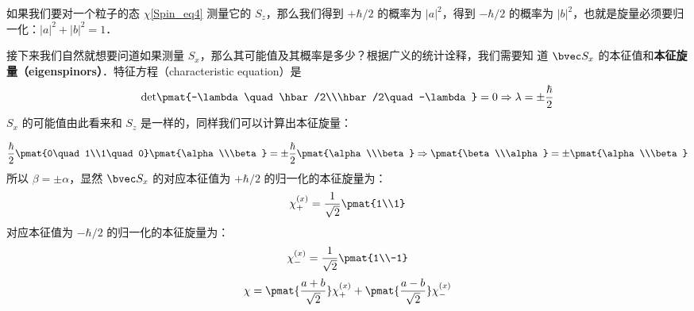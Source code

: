 如果我们要对一个粒子的态 $\chi$\autoref{Spin_eq4} 测量它的 $S_z$，那么我们得到 $+\hbar/2$ 的概率为 $|a|^2$，得到 $-\hbar/2$ 的概率为 $|b|^2$，也就是旋量必须要归一化：$|a|^2+ |b|^2 = 1$．

接下来我们自然就想要问道如果测量 $S_x$，那么其可能值及其概率是多少？根据广义的统计诠释，我们需要知
道 $\bvec S_x$ 的本征值和\textbf{本征旋量（eigenspinors）}．特征方程（characteristic equation）是
\begin{equation}
\rm{det}\pmat{-\lambda \quad \hbar/2\\\hbar/2\quad -\lambda}=0\Rightarrow\lambda=\pm\frac{\hbar}{2}
\end{equation}
$S_x$ 的可能值由此看来和 $S_z$ 是一样的，同样我们可以计算出本征旋量：

\begin{equation}
\frac{\hbar}{2}\pmat{0\quad 1\\1\quad0}\pmat{\alpha\\\beta}=\pm\frac{\hbar}{2}\pmat{\alpha\\\beta} \Rightarrow \pmat{\beta\\\alpha}=\pm\pmat{\alpha\\\beta}
\end{equation}
所以 $\beta=\pm\alpha$，显然 $\bvec S_x$ 的对应本征值为 $+\hbar/2$ 的归一化的本征旋量为：
\begin{equation}\label{Spin_eq5}
\chi_+^{(x)}=\frac{1}{\sqrt{2}}\pmat{1\\1}
\end{equation}
对应本征值为 $-\hbar/2$ 的归一化的本征旋量为：
\begin{equation}\label{Spin_eq6}
\chi_-^{(x)}=\frac{1}{\sqrt{2}}\pmat{1\\-1}
\end{equation}
\begin{equation}
\chi = \pmat{\frac{a+b}{\sqrt{2}}}\chi_+^{(x)}+\pmat{\frac{a-b}{\sqrt{2}}}\chi_-^{(x)}
\end{equation}

